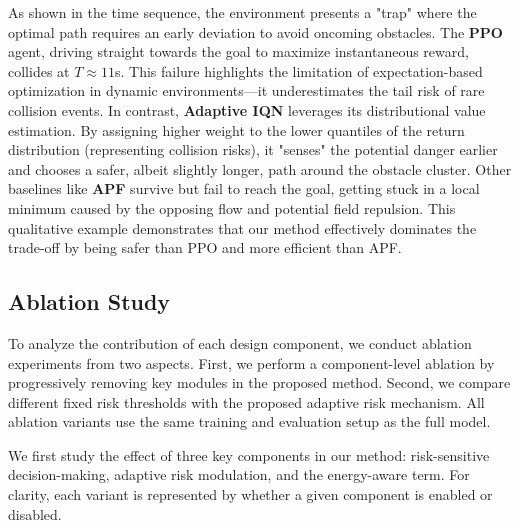 \documentclass[runningheads]{llncs}
\begin{document}
As shown in the time sequence, the environment presents a "trap" where the optimal path requires an early deviation to avoid oncoming obstacles. 
The \textbf{PPO} agent, driving straight towards the goal to maximize instantaneous reward, collides at $T\approx11$s. This failure highlights the limitation of expectation-based optimization in dynamic environments—it underestimates the tail risk of rare collision events.
In contrast, \textbf{Adaptive IQN} leverages its distributional value estimation. By assigning higher weight to the lower quantiles of the return distribution (representing collision risks), it "senses" the potential danger earlier and chooses a safer, albeit slightly longer, path around the obstacle cluster.
Other baselines like \textbf{APF} survive but fail to reach the goal, getting stuck in a local minimum caused by the opposing flow and potential field repulsion. 
This qualitative example demonstrates that our method effectively dominates the trade-off by being safer than PPO and more efficient than APF.

\subsection{Ablation Study}
\label{sec:ablation}

To analyze the contribution of each design component, we conduct ablation experiments from two aspects.
First, we perform a component-level ablation by progressively removing key modules in the proposed method.
Second, we compare different fixed risk thresholds with the proposed adaptive risk mechanism.
All ablation variants use the same training and evaluation setup as the full model.

We first study the effect of three key components in our method: risk-sensitive decision-making, adaptive risk modulation, and the energy-aware term.
For clarity, each variant is represented by whether a given component is enabled or disabled.

\end{document}
